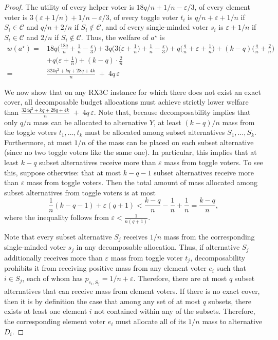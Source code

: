 \documentclass[11pt]{article}
\begin{document}
\begin{proof}
 The utility of every helper voter is $18q/n+1/n-\varepsilon/3$, of every element voter is $3(\varepsilon+1/n)+1/n-\varepsilon/3$, of every toggle voter $t_i$ is $q/n+\varepsilon+1/n$ if $S_i \in \mathcal{C}$ and $q/n+2/n$ if $S_i \not \in \mathcal{C}$, and of every single-minded voter $s_i$ is $\varepsilon+1/n$ if $S_i \in \mathcal{C}$ and $2/n$ if $S_i \not \in \mathcal{C}$. Thus, the welfare of $a^\star$ is 
 \begin{align*}
     w(a^\star) ={} & 18q\bigg(\frac{18q}{n}+\frac{1}{n}-\frac{\varepsilon}{3}\bigg) + 3q\bigg(3\bigg(\varepsilon+\frac{1}{n}\bigg)+\frac{1}{n}-\frac{\varepsilon}{3} \bigg) +q \bigg(\frac{q}{n}+\varepsilon+\frac{1}{n}\bigg) + (k-q)\bigg(\frac{q}{n} + \frac{2}{n}\bigg) \\
     & + q\bigg(\varepsilon+\frac{1}{n}\bigg) + (k-q)\cdot \frac{2}{n} \\ 
     ={} &\frac{324q^{2} + kq + 28q + 4k}{n} \;+\; 4q\,\varepsilon
 \end{align*}

We now show that on any RX3C instance for which there does not exist an exact cover, all decomposable budget allocations must achieve strictly lower welfare than $\frac{324q^{2} + kq + 28q + 4k}{n} \;+\; 4q\,\varepsilon$. Note that, because decomposability implies that only $q/n$ mass can be allocated to alternative $Y$, at least $(k-q)/n$ mass from the toggle voters $t_1, \ldots, t_k$ must be allocated among subset alternatives $S_1, \ldots, S_k$. Furthermore, at most $1/n$ of the mass can be placed on each subset alternative (since no two toggle voters like the same one). In particular, this implies that at least $k-q$ subset alternatives receive more than $\varepsilon$ mass from toggle voters. To see this, suppose otherwise: that at most $k-q-1$ subset alternatives receive more than $\varepsilon$ mass from toggle voters. Then the total amount of mass allocated among subset alternatives from toggle voters is at most 
\[
\frac{1}{n}(k-q-1) + \varepsilon(q+1) < \frac{k-q}{n}-\frac{1}{n}+\frac{1}{n}=\frac{k-q}{n},
\]
where the inequality follows from $\varepsilon<\frac{1}{n(q+1)}$.

Note that every subset alternative $S_j$ receives $1/n$ mass from the corresponding single-minded voter $s_j$ in any decomposable allocation. Thus, if alternative $S_j$ additionally receives more than $\varepsilon$ mass from toggle voter $t_j$, decomposability prohibits it from receiving positive mass from any element voter $e_i$ such that $i\in S_j$, each of whom has $p_{e_i,S_j}=1/n+\varepsilon$. Therefore, there are at most $q$ subset alternatives that can receive mass from element voters. If there is no exact cover, then it is by definition the case that among any set of at most $q$ subsets, there exists at least one element $i$ not contained within any of the subsets. Therefore, the corresponding element voter $e_i$ must allocate all of its $1/n$ mass to alternative $D_i$. 


\end{proof}
\end{document}
